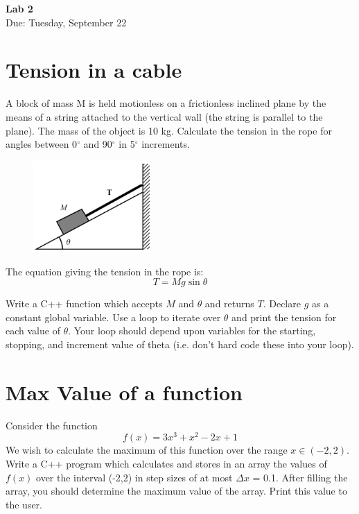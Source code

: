 \documentclass{article}
\begin{document}
\fancyfoot[C]{\thepage}
\vspace*{0cm}
\begin{center}
	{\LARGE \textbf{Lab 2}}\\
	\vspace{0.25cm}
	{\Large Due: Tuesday, September 22}
\end{center}

\section{Tension in a cable}
A block of mass M is held motionless on a frictionless inclined plane by the means of a string attached to the vertical wall (the string is parallel to the plane).  The mass of the object is 10 kg.  Calculate the tension in the rope for angles between 0$^\circ$ and 90$^\circ$ in 5$^\circ$ increments.
\begin{figure}[ht!]
	\includegraphics[width=0.4\textwidth,right]{tension.png}
\end{figure}

The equation giving the tension in the rope is:
\begin{equation*}
T=Mg\sin{\theta}
\end{equation*}

Write a C++ function which accepts $M$ and $\theta$ and returns $T$. Declare $g$ as a constant global variable. Use a loop to iterate over $\theta$ and print the tension for each value of $\theta$. Your loop should depend upon variables for the starting, stopping, and increment value of theta (i.e. don't hard code these into your loop).

\section{Max Value of a function}
Consider the function
\begin{equation*}
f(x) = 3x^3+x^2-2x+1
\end{equation*}
We wish to calculate the maximum of this function over the range $x\in(-2,2)$.
Write a C++ program which calculates and stores in an array the values of $f(x)$ over the interval (-2,2) in step sizes of at most $\Delta x$ = 0.1. After filling the array, you should determine the maximum value of the array. Print this value to the user.
\end{document}
